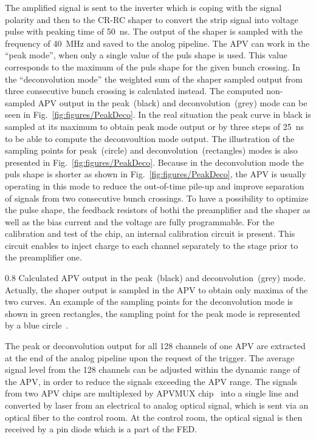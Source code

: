 The amplified signal is sent to the inverter which is coping with the signal polarity and then to the CR-RC shaper to convert the strip signal into voltage pulse with peaking time of 50~ns. The output of the shaper is sampled with the frequency of 40~MHz and saved to the anolog pipeline. The APV can work in the ``peak mode'', when only a single value of the puls shape is used. This value corresponds to the maximum of the puls shape for the given bunch crossing. In the ``deconvolution mode'' the weighted sum of the shaper sampled output from three consecutive bunch crossing is calculated instead. The computed non-sampled APV output in the peak~(black) and deconvolution~(grey) mode can be seen in Fig.~\ref{fig:figures/PeakDeco}. In the real situation the peak curve in black is sampled at its maximum to obtain peak mode output or by three steps of 25~ns to be able to compute the deconvoultion mode output. The illustration of the sampling points for peak~(circle) and deconvolution~(rectangles) modes is also presented in Fig.~\ref{fig:figures/PeakDeco}. Because in the deconvolution mode the puls shape is shorter as shown in Fig.~\ref{fig:figures/PeakDeco}, the APV is usually operating in this mode to reduce the out-of-time pile-up and improve separation of signals from two consecutive bunch crossings. To have a possibility to optimize the pulse shape, the feedback resistors of bothi the preamplifier and the shaper as well as the  bias current and the voltage are fully programmable. For the calibration and test of the chip, an internal calibration circuit is present. This circuit enables to inject charge to each channel separately to the stage prior to the preamplifier one.


                 {0.8}       %
                 {Calculated APV output in the peak~(black) and deconvolution~(grey) mode. Actually, the shaper output is sampled in the APV to obtain only maxima of the two curves. An example of the sampling points for the deconvolution mode is shown in green rectangles, the sampling point for the peak mode is represented by a blue circle~\cite{Friedl:2001kra}.} %


The peak or deconvolution output for all 128 channels of one APV are extracted at the end of the analog pipeline upon the request of the trigger. The average signal level from the 128 channels can be adjusted within the dynamic range of the APV, in order to reduce the signals exceeding the APV range. The signals from two APV chips are multiplexed by APVMUX chip~\cite{Ball:2007zza} into a single line and converted by laser from an electrical to analog optical signal, which is sent via an optical fiber to the control room. At the control room, the optical signal is then received by a pin diode which is a part of the FED.

